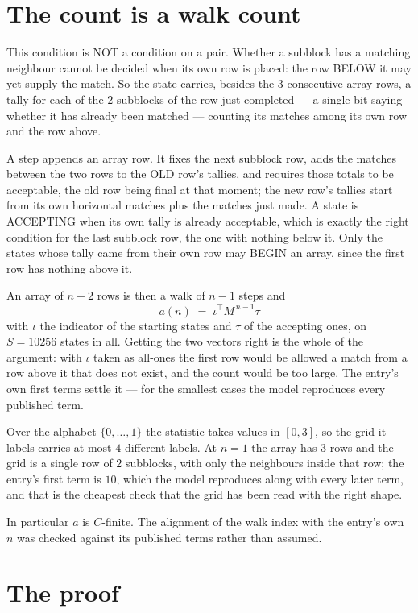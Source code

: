 \documentclass[11pt,a4paper]{article}
\theoremstyle{plain}
\theoremstyle{definition}
\begin{document}
\section{The count is a walk count}

This condition is NOT a condition on a pair. Whether a subblock has a
matching neighbour cannot be decided when its own row is placed: the row BELOW it may yet
supply the match. So the state carries, besides the $3$ consecutive array rows, a tally for
each of the $2$ subblocks of the row just completed --- a single bit saying whether it has already been matched --- counting its matches
among its own row and the row above.

A step appends an array row. It fixes the next subblock row, adds the matches between the two
rows to the OLD row's tallies, and requires those totals to be acceptable, the old row being
final at that moment; the new row's tallies start from its own horizontal matches plus the
matches just made. A state is ACCEPTING when its own tally is already acceptable, which is
exactly the right condition for the last subblock row, the one with nothing below it. Only the
states whose tally came from their own row may BEGIN an array, since the first row has nothing
above it.

An array of $n+2$ rows is then a walk of $n-1$ steps and
\[
a(n)\;=\;\iota^{\!\top}M^{\,n-1}\tau
\]
with $\iota$ the indicator of the starting states and $\tau$ of the accepting ones, on
$S=10256$ states in all. Getting the two vectors right is the whole of the argument: with
$\iota$ taken as all-ones the first row would be allowed a match from a row above it that does
not exist, and the count would be too large. The entry's own first terms settle it --- for
the smallest cases
the model reproduces every published term.

Over the alphabet $\{0,\dots,1\}$ the statistic takes values in $[0,3]$, so the
grid it labels carries at most $4$ different labels. At $n=1$ the array has $3$
rows and the grid is a single row of $2$
subblocks, with only the neighbours inside that row; the entry's first term is
$10$, which the model reproduces along with every later term, and that is the cheapest
check that the grid has been read with the right shape.

In particular $a$ is $C$-finite. The alignment of the walk index with the entry's own $n$ was
checked against its published terms rather than assumed.

\section{The proof}
\end{document}
